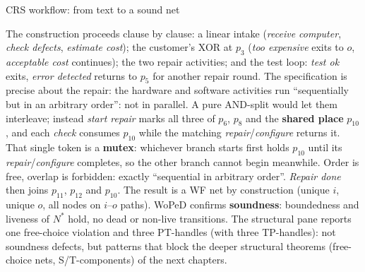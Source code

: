 \begin{examplebox}{CRS workflow: from text to a sound net}
\begin{center}
{}
\end{center}
The construction proceeds clause by clause: a linear intake (\emph{receive computer}, \emph{check defects}, \emph{estimate cost}); the customer's XOR at $p_3$ (\emph{too expensive} exits to $o$, \emph{acceptable cost} continues); the two repair activities; and the test loop: \emph{test ok} exits, \emph{error detected} returns to $p_5$ for another repair round. The specification is precise about the repair: the hardware and software activities run ``sequentially but in an arbitrary order'': not in parallel. A pure AND-split would let them interleave; instead \emph{start repair} marks all three of $p_6$, $p_8$ and the \textbf{shared place} $p_{10}$, and each \emph{check} consumes $p_{10}$ while the matching \emph{repair}/\emph{configure} returns it. That single token is a \textbf{mutex}: whichever branch starts first holds $p_{10}$ until its \emph{repair}/\emph{configure} completes, so the other branch cannot begin meanwhile. Order is free, overlap is forbidden: exactly ``sequential in arbitrary order''. \emph{Repair done} then joins $p_{11}$, $p_{12}$ and $p_{10}$. The result is a WF net by construction (unique $i$, unique $o$, all nodes on $i$--$o$ paths). WoPeD confirms \textbf{soundness}: boundedness and liveness of $N^*$ hold, no dead or non-live transitions. The structural pane reports one free-choice violation and three PT-handles (with three TP-handles): not soundness defects, but patterns that block the deeper structural theorems (free-choice nets, S/T-components) of the next chapters.
\end{examplebox}
